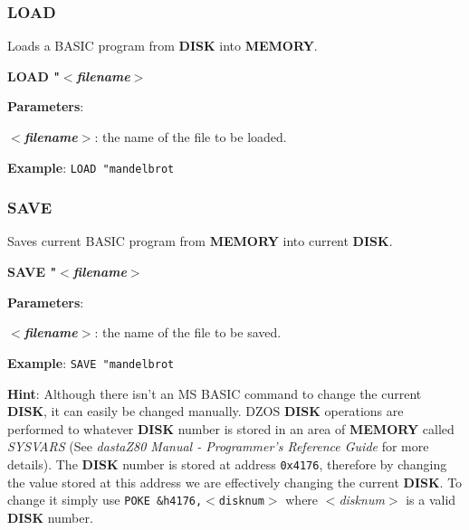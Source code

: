         \subsubsection{{LOAD}}
        Loads a BASIC program from \textbf{DISK} into \textbf{MEMORY}.

        \hspace{1.9cm}\textbf{LOAD "\textit{$<$filename$>$}}

        \textbf{Parameters}:

        \hspace{1cm}\textbf{\textit{$<$filename$>$}}: the name of the file to be
        loaded.

        \textbf{Example}: \texttt{LOAD "mandelbrot}

        \subsubsection{{SAVE}}
        Saves current BASIC program from \textbf{MEMORY} into current
        \textbf{DISK}.

        \hspace{1.9cm}\textbf{SAVE "\textit{$<$filename$>$}}

        \textbf{Parameters}:

        \hspace{1cm}\textbf{\textit{$<$filename$>$}}: the name of the file to be
        saved.

        \textbf{Example}: \texttt{SAVE "mandelbrot}

        \textbf{Hint}: Although there isn't an MS BASIC command to change the
        current \textbf{DISK}, it can easily be changed manually. DZOS
        \textbf{DISK} operations are performed to whatever \textbf{DISK} number
        is stored in an area of \textbf{MEMORY} called \textit{SYSVARS}
        (See \textit{dastaZ80 Manual - Programmer’s Reference Guide} for more
        details). The \textbf{DISK} number is stored at address \texttt{0x4176},
        therefore by changing the value stored at this address we are
        effectively changing the current \textbf{DISK}. To change it simply use
        \texttt{POKE \&h4176,$<$disknum$>$} where \textit{$<$disknum$>$} is a
        valid \textbf{DISK} number.

